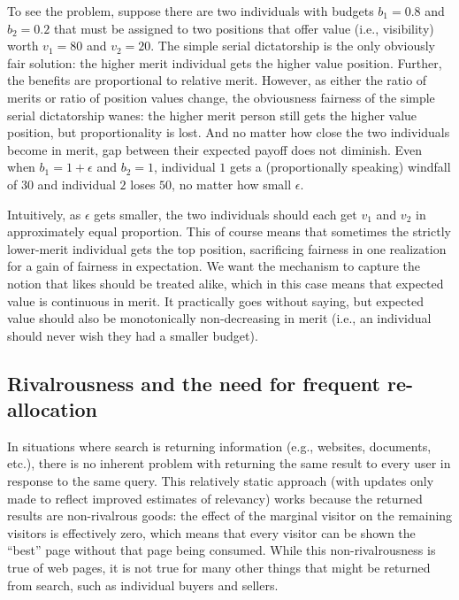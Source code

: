 \documentclass[prodmode,acmec]{acmsmall}
\begin{document}
To see the problem, suppose there are two individuals with budgets
$b_1 = 0.8$ and $b_2 = 0.2$ that must be assigned to two positions
that offer value (i.e., visibility) worth $v_1 = 80$ and $v_2 =
20$. The simple serial dictatorship is the only obviously fair
solution: the higher merit individual gets the higher value
position. Further, the benefits are proportional to relative
merit. However, as either the ratio of merits or ratio of position
values change, the obviousness fairness of the simple serial
dictatorship wanes: the higher merit person still gets the higher
value position, but proportionality is lost. And no matter how close
the two individuals become in merit, gap between their expected payoff
does not diminish. Even when $b_1 = 1 + \epsilon$ and $b_2 = 1$,
individual $1$ gets a (proportionally speaking) windfall of $30$ and
individual $2$ loses $50$, no matter how small $\epsilon$.

Intuitively, as $\epsilon$ gets smaller, the two individuals should
each get $v_1$ and $v_2$ in approximately equal proportion. This of
course means that sometimes the strictly lower-merit individual gets
the top position, sacrificing fairness in one realization for a gain
of fairness in expectation. We want the mechanism to capture the
notion that likes should be treated alike, which in this case means
that expected value is continuous in merit. It practically goes
without saying, but expected value should also be monotonically
non-decreasing in merit (i.e., an individual should never wish they
had a smaller budget).

\subsection{Rivalrousness and the need for frequent re-allocation} 
In situations where search is returning information (e.g., websites,
documents, etc.), there is no inherent problem with returning the same
result to every user in response to the same query. This relatively
static approach (with updates only made to reflect improved estimates
of relevancy) works because the returned results are non-rivalrous
goods: the effect of the marginal visitor on the remaining visitors is
effectively zero, which means that every visitor can be shown the
``best'' page without that page being consumed. While this
non-rivalrousness is true of web pages, it is not true for many other
things that might be returned from search, such as individual buyers
and sellers.
\end{document}
